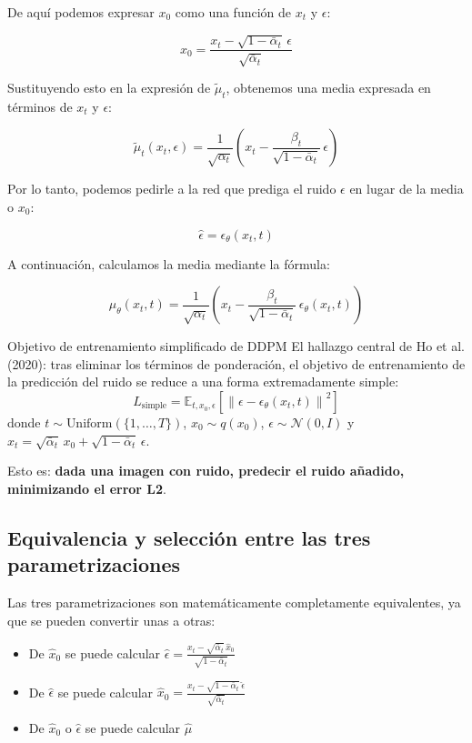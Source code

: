 De aquí podemos expresar $x_0$ como una función de $x_t$ y $\epsilon$:

$$x_0 = \frac{x_t - \sqrt{1 - \bar{\alpha}_t}\, \epsilon}{\sqrt{\bar{\alpha}_t}}$$

Sustituyendo esto en la expresión de $\tilde{\mu}_t$, obtenemos una media expresada en términos de $x_t$ y $\epsilon$:

$$\tilde{\mu}_t(x_t, \epsilon) = \frac{1}{\sqrt{\alpha_t}}\left(x_t - \frac{\beta_t}{\sqrt{1 - \bar{\alpha}_t}}\, \epsilon\right)$$

Por lo tanto, podemos pedirle a la red que prediga el ruido $\epsilon$ en lugar de la media o $x_0$:

$$\hat{\epsilon} = \epsilon_\theta(x_t, t)$$

A continuación, calculamos la media mediante la fórmula:

$$\mu_\theta(x_t, t) = \frac{1}{\sqrt{\alpha_t}}\left(x_t - \frac{\beta_t}{\sqrt{1 - \bar{\alpha}_t}}\, \epsilon_\theta(x_t, t)\right)$$

\begin{importantbox}{Objetivo de entrenamiento simplificado de DDPM}
El hallazgo central de Ho et al. (2020): tras eliminar los términos de ponderación, el objetivo de entrenamiento de la predicción del ruido se reduce a una forma extremadamente simple:
$$L_{\text{simple}} = \mathbb{E}_{t, x_0, \epsilon}\left[\left\| \epsilon - \epsilon_\theta(x_t, t) \right\|^2\right]$$
donde $t \sim \text{Uniform}(\{1, \dots, T\})$, $x_0 \sim q(x_0)$, $\epsilon \sim \mathcal{N}(0, I)$ y $x_t = \sqrt{\bar{\alpha}_t}\, x_0 + \sqrt{1 - \bar{\alpha}_t}\, \epsilon$.

Esto es: \textbf{dada una imagen con ruido, predecir el ruido añadido, minimizando el error L2}.
\end{importantbox}

\subsection{Equivalencia y selección entre las tres parametrizaciones}

Las tres parametrizaciones son matemáticamente completamente equivalentes, ya que se pueden convertir unas a otras:

\begin{itemize}
    \item De $\hat{x}_0$ se puede calcular $\hat{\epsilon} = \frac{x_t - \sqrt{\bar{\alpha}_t}\, \hat{x}_0}{\sqrt{1-\bar{\alpha}_t}}$
    \item De $\hat{\epsilon}$ se puede calcular $\hat{x}_0 = \frac{x_t - \sqrt{1-\bar{\alpha}_t}\, \hat{\epsilon}}{\sqrt{\bar{\alpha}_t}}$
    \item De $\hat{x}_0$ o $\hat{\epsilon}$ se puede calcular $\hat{\mu}$
\end{itemize}

